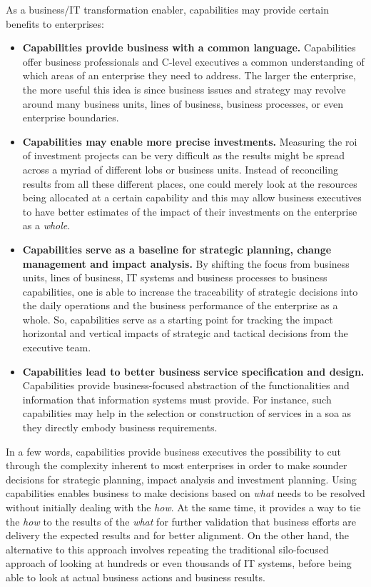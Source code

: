 %
%
As a business/IT transformation enabler, capabilities may provide certain benefits to enterprises:

\begin{itemize}
    \item \textbf{Capabilities provide business with a common language.}
          Capabilities offer business professionals and C-level executives a common understanding of which areas of an
          enterprise they need to address.
          The larger the enterprise, the more useful this idea is since business issues and strategy may revolve
          around many business units, lines of business, business processes, or even enterprise boundaries.
    \item \textbf{Capabilities may enable more precise investments.}
          Measuring the \gls{roi} of investment projects can be very difficult as the results might be spread across a
          myriad of different \glspl{lob} or business units.
          Instead of reconciling results from all these different places,
          one could merely look at the resources being allocated at a certain capability and this may allow
          business executives to have better estimates of the impact of their investments on the
          enterprise as a \textit{whole}.
    \item \textbf{Capabilities serve as a baseline for strategic planning, change management and impact analysis.}
          By shifting the focus from business units, lines of business, IT systems and business processes
          to business capabilities, one is able to increase the traceability of strategic decisions into the
          daily operations and the business performance of the enterprise as a whole.
          So, capabilities serve as a starting point for tracking the impact horizontal and vertical
          impacts of strategic and tactical decisions from the executive team.
    \item \textbf{Capabilities lead to better business service specification and design.}
          Capabilities provide business-focused abstraction of the functionalities and information that
          information systems must provide.
          For instance, such capabilities may help in the selection or construction of services in a
          \gls{soa} as they directly embody business requirements.
\end{itemize}

In a few words, capabilities provide business executives the possibility to cut through the complexity inherent
to most enterprises in order to make sounder decisions for strategic planning, impact analysis and investment planning.
Using capabilities enables business to make decisions based on \textit{what} needs to be resolved without initially
dealing with the \textit{how}.
At the same time, it provides a way to tie the \textit{how} to the results of the \textit{what}
for further validation that business efforts are delivery the expected results and for better alignment.
On the other hand, the alternative to this approach involves repeating the traditional silo-focused approach of
looking at hundreds or even thousands of IT systems,
before being able to look at actual business actions and business results.

